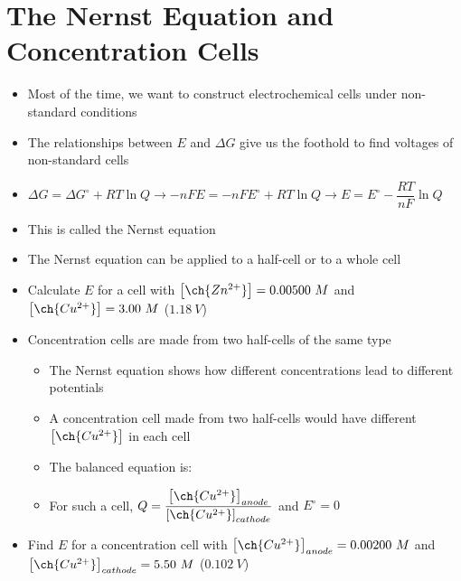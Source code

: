 \documentclass[12pt, openany, letterpaper]{memoir}
\begin{document}
\section{The Nernst Equation and Concentration Cells}
\begin{itemize}
	\item Most of the time, we want to construct electrochemical cells under non-standard conditions
	\item The relationships between $E$ and $\Delta G$ give us the foothold to find voltages of non-standard cells
	\item $\Delta G = \Delta G^\circ + RT\ln Q \rightarrow -nFE = -nFE^\circ + RT\ln Q \rightarrow E = E^\circ - \dfrac{RT}{nF}\ln Q$ 
	\item This is called the Nernst equation
	\item The Nernst equation can be applied to a half-cell or to a whole cell
	\item Calculate $E$ for a  cell with $\left[\ch{Zn^{2+}}\right]=0.00500~M$ and $\left[\ch{Cu^{2+}}\right]=3.00~M$ \hspace{1em} ($1.18~V$)
	\item Concentration cells are made from two half-cells of the same type
	\begin{itemize}
		\item The Nernst equation shows how different concentrations lead to different potentials
		\item A concentration cell made from two  half-cells would have different $\left[\ch{Cu^{2+}}\right]$ in each cell
		\item The balanced equation is: 
		\item For such a cell, $Q=\dfrac{\left[\ch{Cu^{2+}}\right]_{anode}}{\left[\ch{Cu^{2+}}\right]_{cathode}}$ \hspace{1em} and $E^\circ = 0$
	\end{itemize}
	\item Find $E$ for a  concentration cell with $\left[\ch{Cu^{2+}}\right]_{anode} = 0.00200~M$ and $\left[\ch{Cu^{2+}}\right]_{cathode} = 5.50~M$ \hspace{1em} ($0.102~V$)
\end{itemize}
\end{document}
